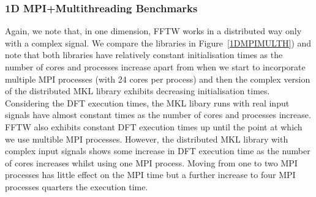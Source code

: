 \documentclass[12pt, a4paper]{article} \setlength{\textheight}{24cm}
\begin{document}
\subsubsection{1D MPI+Multithreading Benchmarks}\label{Sec:1DMPIThread}
Again, we note that, in one dimension, FFTW works in a distributed way
only with a complex signal.  We compare the libraries in
Figure~\ref{1DMPIMULTH}) and note that both libraries have relatively
constant initialisation times as the number of cores and processes
increase apart from when we start to incorporate multiple MPI
processes (with 24 cores per process) and then the complex version of
the distributed MKL library exhibits decreasing initialisation times.
Considering the DFT execution times, the MKL libary runs with real
input signals have almost constant times as the number of cores and
processes increase. FFTW also exhibits constant DFT execution times up
until the point at which we use multible MPI processes. However, the
distributed MKL library with complex input signals shows some increase
in DFT execution time as the number of cores increases whilst using
one MPI process. Moving from one to two MPI processes has little
effect on the MPI time but a further increase to four MPI processes
quarters the execution time.
\end{document}
